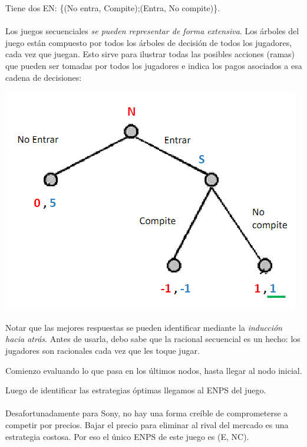 \documentclass{article}
\begin{document}
                Tiene dos EN: \{(No entra, Compite);(Entra, No compite)\}. \\
                \\
                Los juegos secuenciales \emph{se pueden representar de forma extensiva}. Los árboles del juego están compuesto por todos los árboles de decisión de todos los jugadores, cada vez que juegan. Esto sirve para ilustrar todas las posibles acciones (ramas) que pueden ser tomadas por todos los jugadores e indica los pagos asociados a esa cadena de decisiones:
                \begin{center}
                    \includegraphics[width=0.5 \linewidth]{figs/secuenciales.png}
                \end{center}
                Notar que las mejores respuestas se pueden identificar mediante la \emph{inducción hacia atrás}. Antes de usarla, debo sabe que la racional secuencial es un hecho: los jugadores son racionales cada vez que les toque jugar.
                
                Comienzo evaluando lo que pasa en los últimos nodos, hasta llegar al nodo inicial.

                Luego de identificar las estrategias óptimas llegamos al ENPS del juego. \\
                \\
                Desafortunadamente para Sony, no hay una forma creíble de comprometerse a competir por precios. Bajar el precio para eliminar al rival del mercado es una estrategia costosa. Por eso el único ENPS de este juego es (E, NC).
\end{document}
